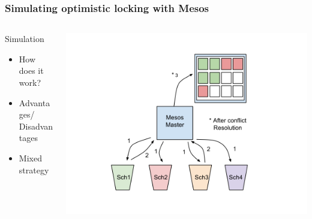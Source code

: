 \documentclass[notes=hide]{beamer}
\begin{document}
  \begin{frame}
    \frametitle{Simulating optimistic locking with Mesos}
       \begin{columns}[T]
       \begin{column}{.4\textwidth}
        \begin{block}{Simulation}
            \begin{itemize}
              \item How does it work?
              \item Advantages/ Disadvantages
              \item Mixed strategy
            \end{itemize}
         \end{block}
       \end{column}
       \begin{column}{.65\textwidth}
         \includegraphics[trim = 63mm 20mm 0mm 20mm,clip,scale=0.35,natwidth=960,natheight=720]{MesosOptimisticLocking-slides.png}
       \end{column}
       \end{columns}
  \end{frame}
\end{document}
